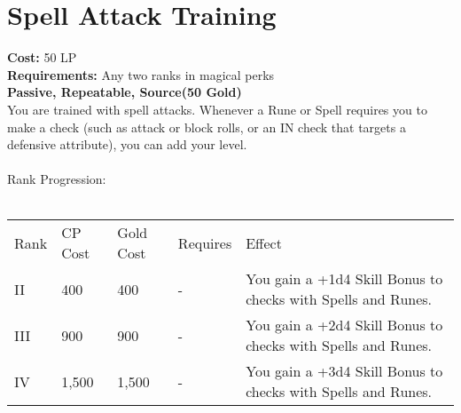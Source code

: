 \section{Spell Attack Training}\label{perk:spellAttackTraining}
\textbf{Cost:} 50 LP\\
\textbf{Requirements:} Any two ranks in magical perks\\
\textbf{Passive, Repeatable, Source(50 Gold)}\\
You are trained with spell attacks.
Whenever a Rune or Spell requires you to make a check (such as attack or block rolls, or an IN check that targets a defensive attribute), you can add your level.\\
\\
Rank Progression:\\
\\
\begin{longtable}{l | l | l | l | p{9cm}}
	Rank & CP Cost & Gold Cost & Requires & Effect\\
	II & 400 & 400 & - & You gain a +1d4 Skill Bonus to checks with Spells and Runes.\\
	III & 900 & 900 & - & You gain a +2d4 Skill Bonus to checks with Spells and Runes.\\
	IV & 1,500 & 1,500 & - & You gain a +3d4 Skill Bonus to checks with Spells and Runes.\\
\end{longtable}